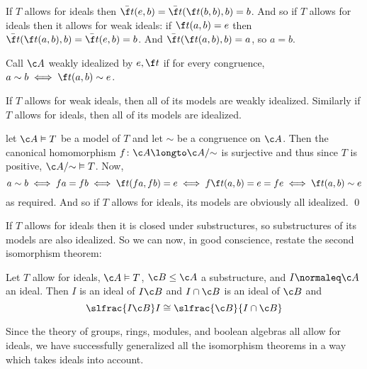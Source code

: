 \edefn

If $T$ allows for ideals then $\bar{\f t}(e,b)=\bar{\f t}(\f t(b,b),b)=b$.
And so if $T$ allows for ideals then it allows for weak ideals: if $\f t(a,b) = e$ then $\bar{\f t}(\f t(a,b),b) = \bar{\f t}(e,b) = b$.
And $\bar{\f t}(\f t(a,b),b)=a$, so $a=b$.

\bdefn

    Call $\c A$ {\emphcolor weakly idealized} by $e,\f t$ if for every congruence, $a\sim b\iff\f t(a,b)\sim e$.

\edefn

\bthrm

    If $T$ allows for weak ideals, then all of its models are weakly idealized.
    Similarly if $T$ allows for ideals, then all of its models are idealized.

\ethrm

\Proof let $\c A\vDash T$ be a model of $T$ and let $\sim$ be a congruence on $\c A$.
Then the canonical homomorphism $f\colon\c A\longto\c A/{\sim}$ is surjective and thus since $T$ is positive, $\c A/{\sim}\vDash T$.
Now,
$$ a\sim b \iff fa = fb \iff \f t(fa,fb) = e \iff f\f t(a,b) = e = fe \iff \f t(a,b) \sim e $$
as required.
And so if $T$ allows for ideals, its models are obviously all idealized.
\qed

If $T$ allows for ideals then it is closed under substructures, so substructures of its models are also idealized.
So we can now, in good conscience, restate the second isomorphism theorem:

\bthrm[title=The Idealized Second Isomorphism Theorem]

    Let $T$ allow for ideals, $\c A\vDash T$, $\c B\leq\c A$ a substructure, and $I\normaleq\c A$ an ideal.
    Then $I$ is an ideal of $I\c B$ and $I\cap\c B$ is an ideal of $\c B$ and
    $$ \slfrac{I\c B}I \cong \slfrac{\c B}{I\cap\c B} $$

\ethrm

Since the theory of groups, rings, modules, and boolean algebras all allow for ideals, we have successfully generalized all the isomorphism theorems in a way which takes ideals into account.

\bye

